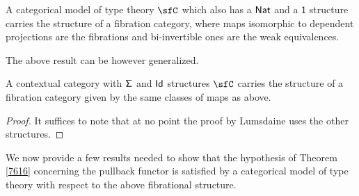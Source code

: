 \begin{prop}
  A categorical model of type theory $\sfC$ which also has a $\operatorname{\mathsf{Nat}}$ and a
  $\mathsf{1}$
  structure carries the structure of a fibration category, where maps isomorphic
  to dependent projections are the fibrations and bi-invertible ones are the
  weak equivalences.
\end{prop}

The above result can be however generalized.

\begin{prop}\label{fibcat}
  A contextual category with $\operatorname{\mathsf{\Sigma}}$ and $\operatorname{\mathsf{Id}}$ structures $\sfC$ carries the
  structure of a fibration category given by the same classes of maps as above.
\end{prop}
\begin{proof}
  It suffices to note that at no point the proof by Lumsdaine uses the other
  structures.
\end{proof}

We now provide a few results needed to show that the hypothesis of Theorem
\ref{7616} concerning the pullback functor is satisfied by a categorical model
of type theory with respect to the above fibrational structure.

